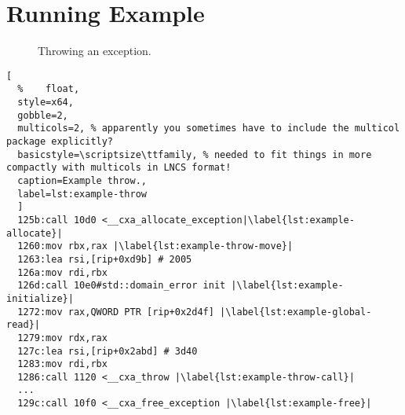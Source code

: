 \section{Running Example}\label{eicfg-example}
\begin{figure}
  \centering
  \caption{Throwing an exception.}\label{fig:example-unwinding}
\end{figure}
\begin{lstlisting}[
  %    float,
  style=x64,
  gobble=2,
  multicols=2, % apparently you sometimes have to include the multicol package explicitly?
  basicstyle=\scriptsize\ttfamily, % needed to fit things in more compactly with multicols in LNCS format!
  caption=Example throw.,
  label=lst:example-throw
  ]
  125b:call 10d0 <__cxa_allocate_exception|\label{lst:example-allocate}|
  1260:mov rbx,rax |\label{lst:example-throw-move}|
  1263:lea rsi,[rip+0xd9b] # 2005
  126a:mov rdi,rbx
  126d:call 10e0#std::domain_error init |\label{lst:example-initialize}|
  1272:mov rax,QWORD PTR [rip+0x2d4f] |\label{lst:example-global-read}|
  1279:mov rdx,rax
  127c:lea rsi,[rip+0x2abd] # 3d40
  1283:mov rdi,rbx
  1286:call 1120 <__cxa_throw |\label{lst:example-throw-call}|
  ...
  129c:call 10f0 <__cxa_free_exception |\label{lst:example-free}|
\end{lstlisting}
